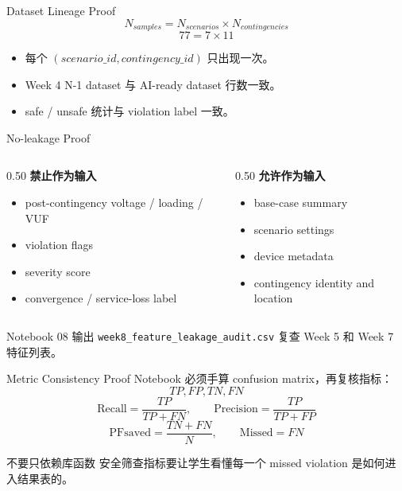\documentclass[aspectratio=169,11pt]{beamer}
\begin{document}
\begin{frame}{Dataset Lineage Proof}
\[
N_{samples} = N_{scenarios} \times N_{contingencies}
\]
\vspace{-0.8cm}
\[
77 = 7 \times 11
\]
\begin{itemize}
  \item 每个 $(scenario\_id, contingency\_id)$ 只出现一次。
  \item Week 4 N-1 dataset 与 AI-ready dataset 行数一致。
  \item safe / unsafe 统计与 violation label 一致。
\end{itemize}
\end{frame}

\begin{frame}{No-leakage Proof}
\begin{columns}
\begin{column}{0.50\textwidth}
\textbf{禁止作为输入}
\begin{itemize}
  \item post-contingency voltage / loading / VUF
  \item violation flags
  \item severity score
  \item convergence / service-loss label
\end{itemize}
\end{column}
\begin{column}{0.50\textwidth}
\textbf{允许作为输入}
\begin{itemize}
  \item base-case summary
  \item scenario settings
  \item device metadata
  \item contingency identity and location
\end{itemize}
\end{column}
\end{columns}
\begin{block}{Notebook 08 输出}
\texttt{week8\_feature\_leakage\_audit.csv} 复查 Week 5 和 Week 7 特征列表。
\end{block}
\end{frame}

\begin{frame}{Metric Consistency Proof}
Notebook 必须手算 confusion matrix，再复核指标：
\[
TP,FP,TN,FN
\]
\[
\mathrm{Recall}=\frac{TP}{TP+FN},\qquad
\mathrm{Precision}=\frac{TP}{TP+FP}
\]
\[
\mathrm{PFsaved}=\frac{TN+FN}{N},\qquad
\mathrm{Missed}=FN
\]
\begin{alertblock}{不要只依赖库函数}
安全筛查指标要让学生看懂每一个 missed violation 是如何进入结果表的。
\end{alertblock}
\end{frame}
\end{document}
